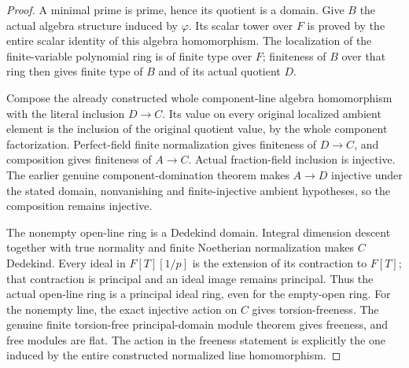 \begin{proof}
A minimal prime is prime, hence its quotient is a domain. Give $B$ the
actual algebra structure induced by $\varphi$. Its scalar tower over $F$
is proved by the entire scalar identity of this algebra homomorphism.
The localization of the finite-variable polynomial ring is of finite type
over $F$; finiteness of $B$ over that ring then gives finite type of $B$
and of its actual quotient $D$.

Compose the already constructed whole component-line algebra homomorphism
with the literal inclusion $D\to C$. Its value on every original localized
ambient element is the inclusion of the original quotient value, by the
whole component factorization. Perfect-field finite normalization gives
finiteness of $D\to C$, and composition gives finiteness of $A\to C$.
Actual fraction-field inclusion is injective. The earlier genuine
component-domination theorem makes $A\to D$ injective under the stated
domain, nonvanishing and finite-injective ambient hypotheses, so the
composition remains injective.

The nonempty open-line ring is a Dedekind domain. Integral dimension
descent together with true normality and finite Noetherian normalization
makes $C$ Dedekind. Every ideal in $F[T][1/p]$ is the extension of its
contraction to $F[T]$; that contraction is principal and an ideal image
remains principal. Thus the actual open-line ring is a principal ideal
ring, even for the empty-open ring. For the nonempty line, the exact
injective action on $C$ gives torsion-freeness. The genuine finite
torsion-free principal-domain module theorem gives freeness, and free
modules are flat. The action in the freeness statement is explicitly the
one induced by the entire constructed normalized line homomorphism.
\end{proof}

